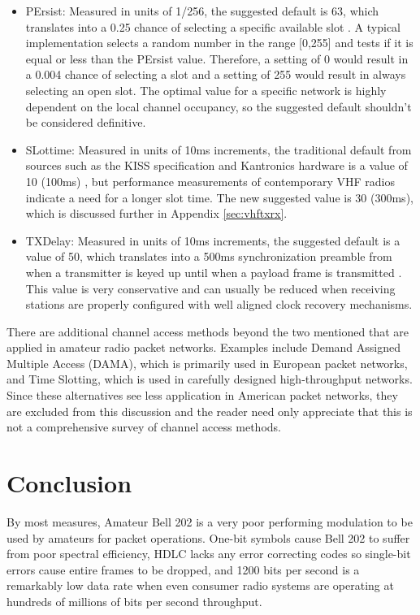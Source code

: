 \documentclass[12pt,letterpaper]{article}
\begin{document}
\begin{itemize}
	\item PErsist: Measured in units of 1/256, the suggested default is
		63, which translates into a 0.25 chance of selecting a specific available
		slot \cite{KISSspec}. 
		A typical implementation selects a random number in the range
		[0,255] and tests if it is equal or less than the PErsist value.
		Therefore, a setting of 0 would result in a 0.004 chance of selecting 
		a slot and a setting of 255 would result in always selecting an open slot.
		The optimal value for a specific network is highly dependent on the
		local channel occupancy, so the suggested default shouldn't
		be considered definitive.
	\item SLottime: Measured in units of 10ms increments, the traditional
		default from sources such as the KISS specification and 
		Kantronics hardware 
		is a value of 10 (100ms) \cite{KISSspec}\cite{kamplusref}, 
		but performance measurements of contemporary VHF radios 
		indicate a need for a longer slot time. 
		The new suggested value is 30 (300ms), which is discussed further
		in Appendix \ref{sec:vhftxrx}.
	\item TXDelay: Measured in units of 10ms increments, the suggested
		default is a value of 50, which translates into a 500ms synchronization
		preamble from when a transmitter is keyed up until when a payload
		frame is transmitted \cite{KISSspec}.
		This value is very conservative and can usually be reduced when
		receiving stations are properly configured with
		well aligned clock recovery mechanisms.
\end{itemize}

There are additional channel access methods beyond the two mentioned
that are applied in amateur radio packet networks. 
Examples include Demand Assigned Multiple Access (DAMA),
which is primarily used in European packet networks,
and Time Slotting, which is used in carefully designed high-throughput networks.
Since these alternatives see less application in American packet networks,
they are excluded from this discussion and the reader need only appreciate that
this is not a comprehensive survey of channel access methods.

\section{Conclusion}


By most measures, Amateur Bell 202 is a very poor performing modulation to
be used by amateurs for packet operations. 
One-bit symbols cause Bell 202 to suffer from poor spectral efficiency,
HDLC lacks any error correcting codes so single-bit errors cause entire 
frames to be dropped, and 1200 bits per second is a remarkably low
data rate when even consumer radio systems are operating at hundreds of millions
of bits per second throughput.
\end{document}
